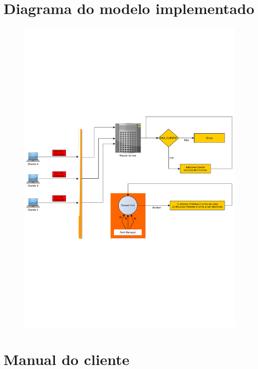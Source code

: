 \lstset{breaklines=true}	%

\section{Diagrama do modelo implementado\label{app:diag}}

	\begin{figure}
		\centering
		\includegraphics[clip,trim=0cm 5.5cm 0cm 5.5cm,width=1\textheight]{Img/AppSchematic}
	\end{figure}

\clearpage
\section{Manual do cliente\label{app:manC}}

